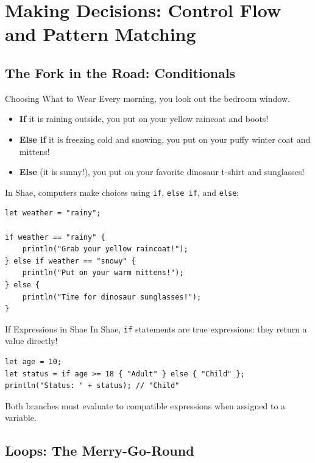 \chapter{Making Decisions: Control Flow and Pattern Matching}

\section{The Fork in the Road: Conditionals}

\begin{kidbox}{Choosing What to Wear}
Every morning, you look out the bedroom window.
\begin{itemize}
    \item \textbf{If} it is raining outside, you put on your yellow raincoat and boots!
    \item \textbf{Else if} it is freezing cold and snowing, you put on your puffy winter coat and mittens!
    \item \textbf{Else} (it is sunny!), you put on your favorite dinosaur t-shirt and sunglasses!
\end{itemize}
In Shae, computers make choices using \texttt{if}, \texttt{else if}, and \texttt{else}:
\begin{lstlisting}[language=shaelang]
let weather = "rainy";

if weather == "rainy" {
    println("Grab your yellow raincoat!");
} else if weather == "snowy" {
    println("Put on your warm mittens!");
} else {
    println("Time for dinosaur sunglasses!");
}
\end{lstlisting}
\end{kidbox}

\begin{syntaxbox}{If Expressions in Shae}
In Shae, \texttt{if} statements are true expressions: they return a value directly!
\begin{lstlisting}[language=shaelang]
let age = 10;
let status = if age >= 18 { "Adult" } else { "Child" };
println("Status: " + status); // "Child"
\end{lstlisting}
Both branches must evaluate to compatible expressions when assigned to a variable.
\end{syntaxbox}

\section{Loops: The Merry-Go-Round}

